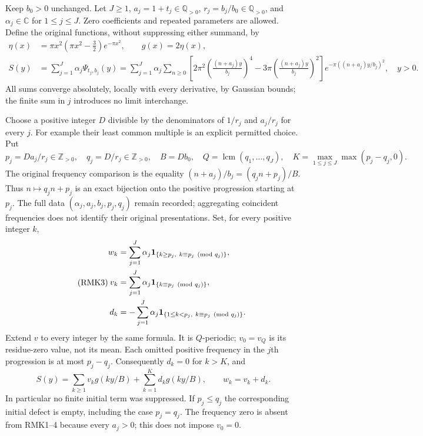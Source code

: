 Keep $b_0>0$ unchanged. Let $J\geq1$, $a_j=1+t_j\in\mathbb Q_{>0}$,
$r_j=b_j/b_0\in\mathbb Q_{>0}$, and $\alpha_j\in\mathbb C$ for
$1\leq j\leq J$. Zero coefficients and repeated parameters are allowed.
Define the original functions, without suppressing either summand, by
\begin{equation}\tag{RMK1}
\begin{split}
 \eta(x)&=\pi x^2(\pi x^2-\tfrac32)e^{-\pi x^2},
 \qquad g(x)=2\eta(x),\\
 S(y)&=\sum_{j=1}^J\alpha_j\Psi_{t_j,b_j}(y)
   =\sum_{j=1}^J\alpha_j\sum_{n\geq0}
       \left[2\pi^2\left(\frac{(n+a_j)y}{b_j}\right)^4
             -3\pi\left(\frac{(n+a_j)y}{b_j}\right)^2\right]
           e^{-\pi((n+a_j)y/b_j)^2},\quad y>0.
\end{split}
\end{equation}
All sums converge absolutely, locally with every derivative, by
Gaussian bounds; the finite sum in $j$ introduces no limit interchange.

Choose a positive integer $D$ divisible by the denominators of
$1/r_j$ and $a_j/r_j$ for every $j$. For example their least common
multiple is an explicit permitted choice. Put
\begin{equation}\tag{RMK2}
 p_j=D a_j/r_j\in\mathbb Z_{>0},\quad
 q_j=D/r_j\in\mathbb Z_{>0},\quad B=D b_0,\quad
 Q=\operatorname{lcm}(q_1,\ldots,q_J),\quad
 K=\max_{1\leq j\leq J}\max(p_j-q_j,0).
\end{equation}
The original frequency comparison is the equality
$(n+a_j)/b_j=(q_jn+p_j)/B$. Thus $n\mapsto q_jn+p_j$
is an exact bijection onto the positive progression starting at $p_j$.
The full data $(\alpha_j,a_j,b_j,p_j,q_j)$ remain recorded; aggregating
coincident frequencies does not identify their original presentations.
Set, for every positive integer $k$,
\begin{equation}\tag{RMK3}
\begin{split}
 w_k&=\sum_{j=1}^J\alpha_j
       {\bf1}_{\{k\geq p_j,\ k\equiv p_j\pmod{q_j}\}},\\
 v_k&=\sum_{j=1}^J\alpha_j
       {\bf1}_{\{k\equiv p_j\pmod{q_j}\}},\\
 d_k&=-\sum_{j=1}^J\alpha_j
       {\bf1}_{\{1\leq k<p_j,\ k\equiv p_j\pmod{q_j}\}}.
\end{split}
\end{equation}
Extend $v$ to every integer by the same formula. It is $Q$-periodic;
$v_0=v_Q$ is its residue-zero value, not its mean. Each omitted
positive frequency in the $j$th progression is at most $p_j-q_j$.
Consequently $d_k=0$ for $k>K$, and
\begin{equation}\tag{RMK4}
 S(y)=\sum_{k\geq1}v_k g(ky/B)+\sum_{k=1}^K d_k g(ky/B),
 \qquad w_k=v_k+d_k.
\end{equation}
In particular no finite initial term was suppressed. If $p_j\leq q_j$
the corresponding initial defect is empty, including the case
$p_j=q_j$. The frequency zero is absent from RMK1--4 because every
$a_j>0$; this does not impose $v_0=0$.

